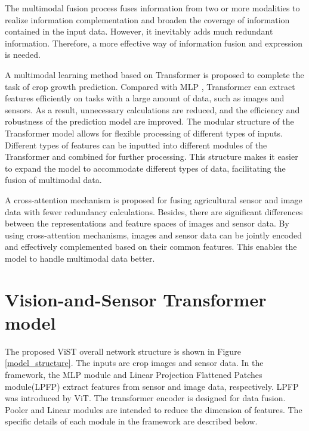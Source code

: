 \documentclass[acmsmall,manuscript, screen, review]{acmart}
\begin{document}
The multimodal fusion process fuses information from two or more modalities to realize information complementation and broaden the coverage of information contained in the input data. \cite{ 8269806} However, it inevitably adds much redundant information. Therefore, a more effective way of information fusion and expression is needed.

 




A multimodal learning method based on Transformer\cite{vaswani_attention_2017} is proposed to complete the task of crop growth prediction. Compared with MLP \cite{ maimaitijiang_soybean_2020}, Transformer can extract features efficiently on tasks with a large amount of data, such as images and sensors. As a result, unnecessary calculations are reduced, and the efficiency and robustness of the prediction model are improved. The modular structure of the Transformer model allows for flexible processing of different types of inputs. Different types of features can be inputted into different modules of the Transformer and combined for further processing. This structure makes it easier to expand the model to accommodate different types of data, facilitating the fusion of multimodal data.

A cross-attention mechanism is proposed for fusing agricultural sensor and image data with fewer redundancy calculations. Besides, there are significant differences between the representations and feature spaces of images and sensor data. By using cross-attention mechanisms, images and sensor data can be jointly encoded and effectively complemented based on their common features. This enables the model to handle multimodal data better.


\section{Vision-and-Sensor Transformer model}

The proposed ViST overall network structure is shown in Figure \ref{model_structure}. The inputs are crop images and sensor data. In the framework, the MLP module and Linear Projection Flattened Patches module(LPFP) extract features from sensor and image data, respectively. LPFP was introduced by ViT\cite{dosovitskiy_image_2021}. The transformer encoder is designed for data fusion. Pooler and Linear modules are intended to reduce the dimension of features. The specific details of each module in the framework are described below.
\end{document}
